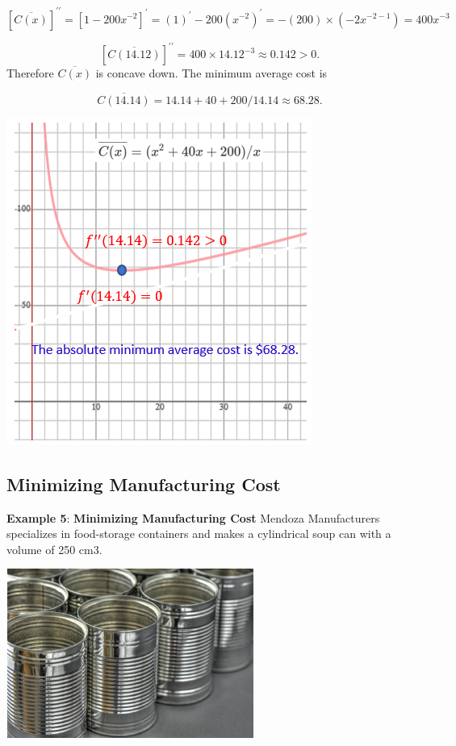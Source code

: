 \documentclass[
]{book}
\begin{document}
\[
[\overline{C(x)}]^{\prime\prime} = [1 -200x^{-2} ]^\prime =  (1)^\prime - 200(x^{-2})^\prime = -(200)\times(-2x^{-2-1}) = 400x^{-3}
\]

\[
[\overline{C(14.12)}]^{\prime\prime} = 400\times 14.12^{-3} \approx 0.142 > 0.
\]
Therefore \(\overline{C(x)}\) is concave down. The minimum average cost is

\[
\overline{C(14.14)} = 14.14 + 40 + 200/14.14 \approx 68.28.
\]

\begin{center}\includegraphics[width=0.55\linewidth]{img09/w09-example04} \end{center}

\hfill\break

\hypertarget{minimizing-manufacturing-cost}{%
\subsection{Minimizing Manufacturing Cost}\label{minimizing-manufacturing-cost}}

\textbf{Example 5}: \textbf{Minimizing Manufacturing Cost} Mendoza Manufacturers specializes in food-storage containers and makes a cylindrical soup can with a volume of 250 cm3.

\begin{center}\includegraphics[width=0.5\linewidth]{img09/w09-example051} \end{center}
\end{document}
